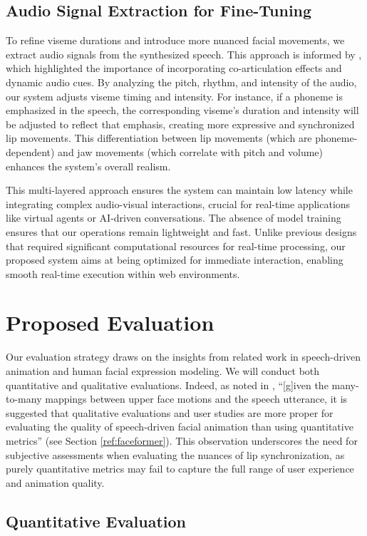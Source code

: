 \documentclass[12pt]{article}
\begin{document}
\subsection{Audio Signal Extraction for Fine-Tuning}
To refine viseme durations and introduce more nuanced facial movements, we extract audio signals from the synthesized speech. This approach is informed by  \cite{Taylor2017}, which highlighted the importance of incorporating co-articulation effects and dynamic audio cues. By analyzing the pitch, rhythm, and intensity of the audio, our system adjusts viseme timing and intensity. For instance, if a phoneme is emphasized in the speech, the corresponding viseme's duration and intensity will be adjusted to reflect that emphasis, creating more expressive and synchronized lip movements. This differentiation between lip movements (which are phoneme-dependent) and jaw movements (which correlate with pitch and volume) enhances the system’s overall realism.

This multi-layered approach ensures the system can maintain low latency while integrating complex audio-visual interactions, crucial for real-time applications like virtual agents or AI-driven conversations.  The absence of model training ensures that our operations remain lightweight and fast. Unlike previous designs that required significant computational resources for real-time processing, our proposed system aims at being optimized for immediate interaction, enabling smooth real-time execution within web environments.
\section{Proposed Evaluation}

Our evaluation strategy draws on the insights from related work in speech-driven animation and human facial expression modeling. We will conduct both quantitative and qualitative evaluations. Indeed, as noted in \cite{fan2022faceformer}, ``[g]iven the many-to-many mappings between upper face motions and the speech utterance, it is suggested that qualitative evaluations and user studies are more proper for evaluating the quality of speech-driven facial animation than using quantitative metrics'' (see Section \ref{ref:faceformer}). This observation underscores the need for subjective assessments when evaluating the nuances of lip synchronization, as purely quantitative metrics may fail to capture the full range of user experience and animation quality.

\subsection{Quantitative Evaluation}
\end{document}
